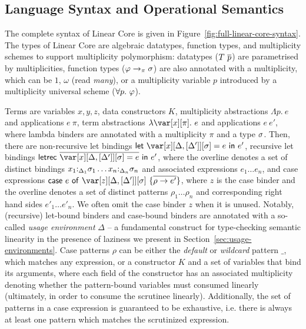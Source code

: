 \documentclass[acmsmall,review,anonymous]{acmart}
\newcommand{\llet}[2]{\mathsf{let}~#1~\mathsf{in}~#2}
\newcommand{\lletrec}[2]{\mathsf{letrec}~#1~\mathsf{in}~#2}
\newcommand{\ccase}[2]{\mathsf{case}~#1~\mathsf{of}~#2}
\begin{document}

\subsection{Language Syntax and Operational Semantics}

The complete syntax of Linear Core is given in Figure~\ref{fig:full-linear-core-syntax}.
%
The types of Linear Core are algebraic datatypes, function types, and
multiplicity schemes to support multiplicity polymorphism: datatypes
($T~\overline{p}$) are parametrised by multiplicities, function types
($\varphi\to_\pi\sigma$) are also annotated with a multiplicity, which can be $1$,
$\omega$ (read \emph{many}), or a multiplicity variable $p$ introduced by a
multiplicity universal scheme ($\forall p.~\varphi$).
%

%
Terms are variables $x,y,z$, data constructors $K$, multiplicity
abstractions $\Lambda p.~e$ and applications $e~\pi$, term abstractions
$\lambda \x[\pi].~e$ and applications $e~e'$, where lambda binders are
annotated with a multiplicity $\pi$ and a type $\sigma$. Then, there are
non-recursive let bindings $\llet{\xD = e}{e'}$, recursive let bindings
$\lletrec{\ov{\xD = e}}{e'}$, where the overline denotes a set of distinct
bindings $x_1{:}_{\Delta_1}\sigma_1\dots x_n{:}_{\Delta_n}\sigma_n$ and associated expressions
$e_1\dots e_n$, and case expressions $\ccase{e}{\zD~\{\ov{\rho \to e'}\}}$,
where $z$ is the case binder and the overline denotes a set of distinct
patterns $\rho_1\dots \rho_n$ and corresponding right hand sides $e'_1\dots
e'_n$. We often omit the case binder $z$ when it is unused. Notably, (recursive) let-bound
binders and case-bound binders are annotated
with a so-called \emph{usage environment} $\Delta$ -- a fundamental construct
for type-checking semantic linearity in the presence of laziness we present in
Section~\ref{sec:usage-environments}.
%
Case patterns $\rho$ can be either the \emph{default} or \emph{wildcard}
pattern $\_$, which matches any expression, or a constructor $K$ and a set of
variables that bind its arguments, where each field of the constructor has an
associated multiplicity denoting whether the pattern-bound variables must
consumed linearly (ultimately, in order to consume the scrutinee linearly).
Additionally, the set of patterns in a case expression is guaranteed to be exhaustive,
i.e. there is always at least one pattern which matches the scrutinized expression.
\end{document}
